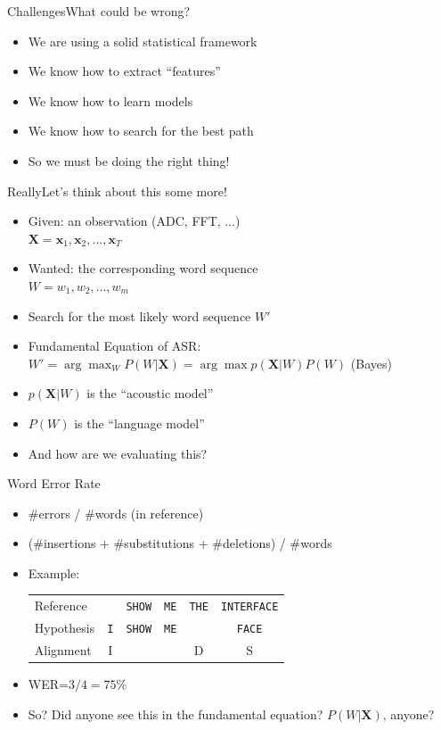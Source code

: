 \begin{frame}{Challenges}{What could be wrong?}
  \begin{itemize}
  \item We are using a solid statistical framework
  \item We know how to extract ``features''
  \item We know how to learn models
  \item We know how to search for the best path
  \item So we must be doing the right thing!
  \end{itemize}
\end{frame}

\begin{frame}{Really}{Let's think about this some more!}
  \begin{itemize}
    \item Given: an observation (ADC, FFT, ...)\\
      $\boldsymbol{X} = \boldsymbol{x}_1, \boldsymbol{x}_2, ..., \boldsymbol{x}_T$
    \item Wanted: the corresponding word sequence\\
      $W = w_1, w_2, ..., w_m$
    \item Search for the most likely word sequence $W'$
    \item Fundamental Equation of ASR: \\
      $W' = \arg \max_W P(W|\boldsymbol{X}) = \arg \max p(\boldsymbol{X}|W) P(W) $ \hspace{1cm} (Bayes)
    \item $p(\boldsymbol{X}|W)$ is the ``acoustic model''
    \item $P(W)$ is the ``language model''
    \item And how are we evaluating this?
  \end{itemize}
\end{frame}

\begin{frame}{Word Error Rate}
  \begin{itemize}
    \item \#errors / \#words (in reference)
    \item (\#insertions + \#substitutions + \#deletions) / \#words
    \item Example:\\
      \begin{tabular}{lccccc}
        Reference  &            & \texttt{SHOW} & \texttt{ME} & \texttt{THE} & \texttt{INTERFACE} \\
        Hypothesis & \texttt{I} & \texttt{SHOW} & \texttt{ME} &              & \texttt{FACE} \\
        Alignment  & \textsc{I} &               &             & \textsc{D}   & \textsc{S} \\
      \end{tabular}
    \item WER=$3/4=75\%$
    \item So? Did anyone see this in the fundamental equation? $P(W|\boldsymbol{X})$, anyone?
  \end{itemize}
\end{frame}

